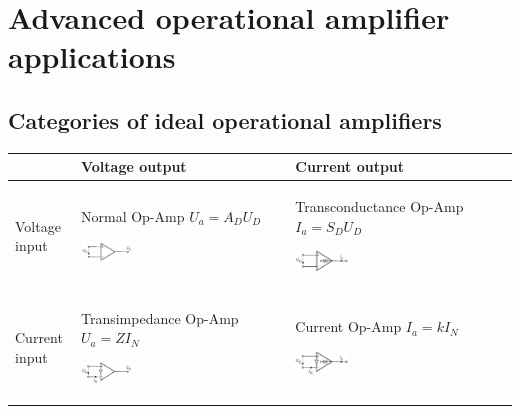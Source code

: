 \section{Advanced operational amplifier applications}

	\subsection{Categories of ideal operational amplifiers}
		\begin{table}[htbp]
			\centering
			\begin{tabularx}{0.9\linewidth}{lXX} \toprule
				& Voltage output & Current output \\ \midrule
					Voltage input 
				& 
					Normal Op-Amp \newline 
					$U_a = A_D U_D$ \newline 
					\begin{center}\includegraphics[width=0.25\textwidth]{images/NormalOPAMP.png}\end{center}  
				& 	Transconductance Op-Amp \newline 
					$I_a = S_D U_D$ \newline
					\begin{center}\includegraphics[width=0.25\textwidth]{images/TransconductanceOPAMP.png}\end{center}
				\\
					Current input 
				& 	Transimpedance Op-Amp \newline 
					$U_a = Z I_N$\newline
					\begin{center}\includegraphics[width=0.25\textwidth]{images/TransimpedanceOPAMP.png}\end{center}
				 & 	Current Op-Amp \newline 
				 	$I_a = k I_N$\newline
				 	\begin{center}\includegraphics[width=0.25\textwidth]{images/CurrentOPAMP.png}\end{center} \\ \bottomrule
			\end{tabularx}
		\end{table}
	
